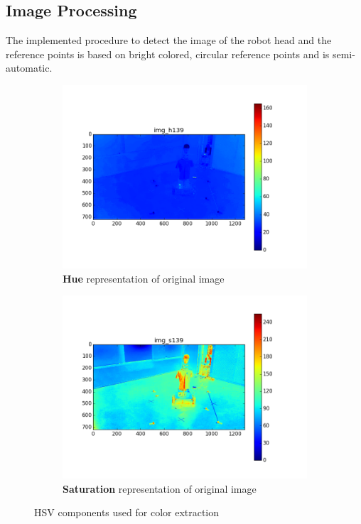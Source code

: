 \subsection{Image Processing}
\label{sec:imageprocessing}

The implemented procedure to detect the image of the robot head and the reference points is based on bright colored, circular reference points and is semi-automatic.

\begin{figure}[htb]
	\begin{subfigure}[b]{0.49\linewidth}
        \centering
		\includegraphics[width=\linewidth]{files/_img_h139.png}
		\caption{\textbf{Hue} representation of original image}
		\label{fig:img_h}
	\end{subfigure}
	\begin{subfigure}[b]{0.49\linewidth}
        \centering
		\includegraphics[width=\linewidth]{files/_img_s139.png}
		\caption{\textbf{Saturation} representation of original image}
		\label{fig:img_s}
	\end{subfigure}
    \caption{HSV components used for color extraction}
\end{figure}
